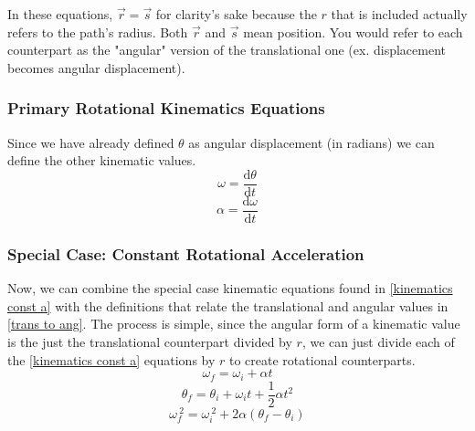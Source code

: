 In these equations, $\vec{r} = \vec{s}$ for clarity's sake because the $r$ that is included actually refers to the path's radius. Both $\vec{r}$ and 
$\vec{s}$ mean position. You would refer to each counterpart as the "angular" version of the translational one 
(ex. displacement becomes angular displacement).

\subsubsection{Primary Rotational Kinematics Equations}
Since we have already defined $\theta$ as angular displacement (in radians) we can define the other kinematic values.
\begin{equation}
    \omega = \frac{\mathrm{d}\theta}{\mathrm{d}t}
\end{equation}
\begin{equation}
    \alpha = \frac{\mathrm{d}\omega}{\mathrm{d}t}
\end{equation}

\subsubsection{Special Case: Constant Rotational Acceleration}
Now, we can combine the special case kinematic equations found in \ref{kinematics const a} with the definitions that relate the translational and angular values in \ref{trans to ang}. The process is simple, since the angular form of a kinematic value is the just the translational counterpart divided by $r$, we can just divide each of the \ref{kinematics const a} equations by $r$ to create rotational counterparts.
\begin{equation}
    \omega_f = \omega_i + \alpha t
\end{equation}
\begin{equation}
    \theta_f = \theta_i + \omega_it+ \frac{1}{2}\alpha t^2 
\end{equation}
\begin{equation}
    \omega_f^{ \: 2} = \omega_i^{ \: 2} + 2 \alpha  (\theta_f - \theta_i)
\end{equation}

